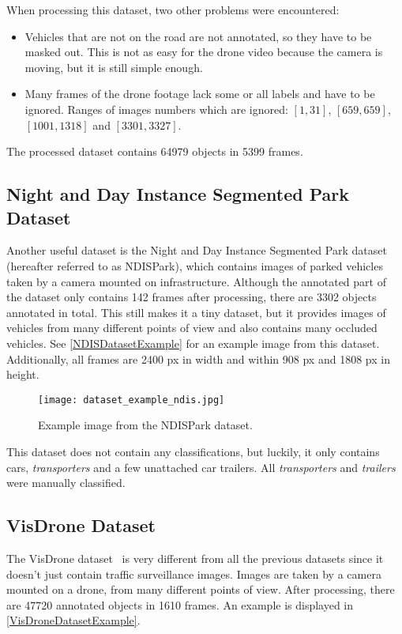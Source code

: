 When processing this dataset, two other problems were encountered:
\begin{itemize}
    \item Vehicles that are not on the road are not annotated, so they have to
    be masked out. This is not as easy for the drone video because the camera is
    moving, but it is still simple enough.
    \item Many frames of the drone footage lack some or all labels and have to
    be ignored. Ranges of images numbers which are ignored: $[1,31]$,
    $[659,659]$, $[1001,1318]$ and $[3301,3327]$.
\end{itemize}
The processed dataset contains \num{64979} objects in \num{5399} frames.


\subsection{Night and Day Instance Segmented Park Dataset}

Another useful dataset is the Night and Day Instance Segmented Park
dataset~\cite{Luca2022} (hereafter referred to as NDISPark), which contains
images of parked vehicles taken by a camera mounted on infrastructure. Although
the annotated part of the dataset only contains \num{142} frames after
processing, there are \num{3302} objects annotated in total. This still makes it
a tiny dataset, but it provides images of vehicles from many different points of
view and also contains many occluded vehicles. See \autoref{NDISDatasetExample}
for an example image from this dataset. Additionally, all frames are \num{2400}
px in width and within \num{908} px and \num{1808} px in height.

\begin{figure}[h]
    \centering
    \texttt{[image: dataset\_example\_ndis.jpg]}
    \caption{Example image from the NDISPark dataset.}
    \label{NDISDatasetExample}
\end{figure}

This dataset does not contain any classifications, but luckily, it only contains
cars, \textit{transporters} and a few unattached car trailers. All
\textit{transporters} and \textit{trailers} were manually classified.


\subsection{VisDrone Dataset}

The VisDrone dataset~\cite{Zhu2022} is very different from all the previous
datasets since it doesn't just contain traffic surveillance images. Images are
taken by a camera mounted on a drone, from many different points of view. After
processing, there are \num{47720} annotated objects in \num{1610} frames. An
example is displayed in \autoref{VisDroneDatasetExample}.

